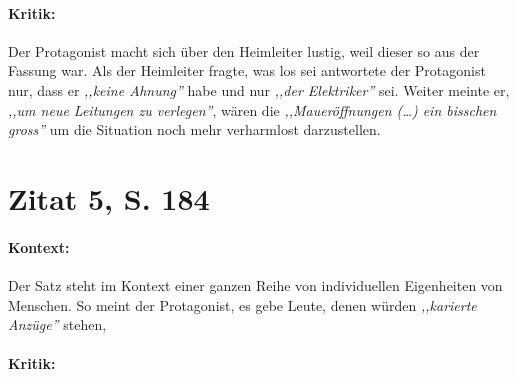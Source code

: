 \documentclass[12pt,twoside,a4paper,twocolumn]{article}
\begin{document}
	\paragraph{Kritik:} Der Protagonist macht sich über den Heimleiter lustig, weil dieser so aus der Fassung war. Als der Heimleiter fragte, was los sei antwortete der Protagonist nur, dass er \textit{,,keine Ahnung''} habe und nur \textit{,,der Elektriker''} sei. Weiter meinte er, \textit{,,um neue Leitungen zu verlegen''}, wären die \textit{,,Maueröffnungen (\dots) ein bisschen gross''} um die Situation noch mehr verharmlost darzustellen.

	\section{Zitat 5, S. 184}
	
	\paragraph{Kontext:} Der Satz steht im Kontext einer ganzen Reihe von individuellen Eigenheiten von Menschen. So meint der Protagonist, es gebe Leute, denen würden \textit{,,karierte Anzüge''} stehen,  
	
	\paragraph{Kritik:} 
	
\end{document}
